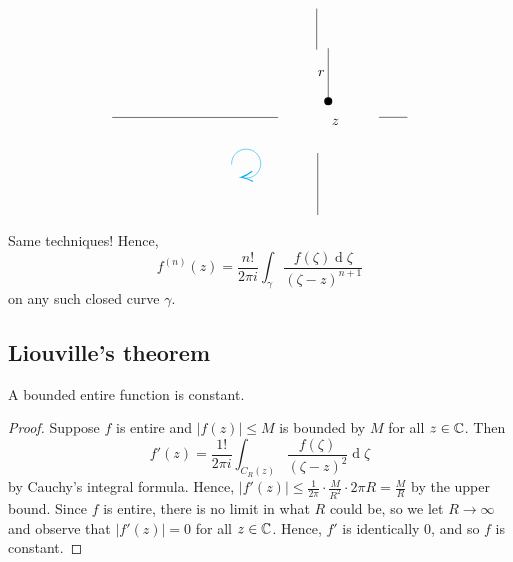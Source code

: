 \documentclass[12pt]{article}
\renewcommand{\d}{\ensuremath{\operatorname{d}}}
\begin{document}
\[\begin{tikzpicture}[x=0.75pt,y=0.75pt,yscale=-1,xscale=1]
    \draw    (315.02,97.83) -- (315.02,148.43) ;
    \draw [shift={(315.02,148.43)}, rotate = 90] [color={rgb, 255:red, 0; green, 0; blue, 0 }  ][fill={rgb, 255:red, 0; green, 0; blue, 0 }  ][line width=0.75]      (0, 0) circle [x radius= 3.35, y radius= 3.35]   ;
    \draw    (109.26,164) -- (267.26,164) ;
    \draw    (363.26,163.86) -- (390.41,163.86) ;
    \draw    (305,198) -- (305,257.26) ;
    \draw    (304,60) -- (304,99.26) ;
    \draw  [draw opacity=0] (232.12,221.17) .. controls (233.6,221.71) and (235.2,222) .. (236.87,222) .. controls (244.53,222) and (250.74,215.79) .. (250.74,208.13) .. controls (250.74,200.47) and (244.53,194.26) .. (236.87,194.26) .. controls (229.21,194.26) and (223,200.47) .. (223,208.13) .. controls (223,208.44) and (223.01,208.74) .. (223.03,209.05) -- (236.87,208.13) -- cycle ; \draw [color=cyan  ,draw opacity=1 ]   (234.05,221.71) .. controls (234.96,221.9) and (235.9,222) .. (236.87,222) .. controls (244.53,222) and (250.74,215.79) .. (250.74,208.13) .. controls (250.74,200.47) and (244.53,194.26) .. (236.87,194.26) .. controls (229.21,194.26) and (223,200.47) .. (223,208.13) .. controls (223,208.44) and (223.01,208.74) .. (223.03,209.05) ;  \draw [shift={(232.12,221.17)}, rotate = 355.35] [color=cyan  ,draw opacity=1 ][line width=0.75]    (10.93,-4.9) .. controls (6.95,-2.3) and (3.31,-0.67) .. (0,0) .. controls (3.31,0.67) and (6.95,2.3) .. (10.93,4.9)   ;
    
    \draw (317.21,164.09) node [anchor=north west][inner sep=0.75pt]    {$z$};
    \draw (303.95,117.47) node [anchor=north west][inner sep=0.75pt]    {$r$};
    
    
    \end{tikzpicture}
    \]
Same techniques! Hence, \[f^{(n)}(z) = \frac{n!}{2\pi i}\int_{\gamma}\frac{f(\zeta)\d \zeta}{(\zeta-z)^{n+1}}\] on any such closed curve $\gamma$.

\subsection{Liouville's theorem}
\begin{theorem}[Liouville's]
    A bounded entire function  is constant.
\end{theorem}
\begin{proof}
    Suppose $f$ is entire and $|f(z)|\leq M$ is bounded by $M$ for all $z\in \mathbb{C}$. Then \[f'(z)=\frac{1!}{2\pi i}\int_{C_R(z)}\frac{f(\zeta)}{(\zeta-z)^2}\d \zeta\] by Cauchy's integral formula. Hence, $|f'(z)|\leq \frac{1}{2\pi}\cdot \frac{M}{R^2}\cdot 2\pi R=\frac{M}{R}$ by the upper bound. Since $f$ is entire, there is no limit in what $R$ could be, so we let $R\to \infty$ and observe that $|f'(z)|=0$ for all $z\in \mathbb{C}$. Hence, $f'$ is identically 0, and so $f$ is constant.
\end{proof}
\end{document}

